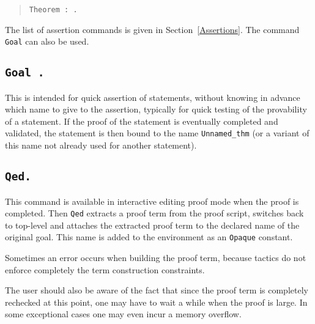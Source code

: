 \begin{quote}
{\tt Theorem {\ident} \zeroone{\binders} : {\form}.
\label{Theorem}}
\end{quote}

The list of assertion commands is given in
Section~\ref{Assertions}. The command {\tt Goal} can also be used.

\subsection[Goal {\form}.]{\tt Goal {\form}.\label{Goal}}

This is intended for quick assertion of statements, without knowing in
advance which name to give to the assertion, typically for quick
testing of the provability of a statement. If the proof of the
statement is eventually completed and validated, the statement is then
bound to the name {\tt Unnamed\_thm} (or a variant of this name not
already used for another statement).

\subsection[\tt Qed.]{\tt Qed.\label{Qed}}
This command is available in interactive editing proof mode when the
proof is completed.  Then {\tt Qed} extracts a proof term from the
proof script, switches back to {\Coq} top-level and attaches the
extracted proof term to the declared name of the original goal. This
name is added to the environment as an {\tt Opaque} constant.

\begin{ErrMsgs}
\item {}
\item Sometimes an error occurs when building the proof term,
because tactics do not enforce completely the term construction
constraints.

The user should also be aware of the fact that since the proof term is
completely rechecked at this point, one may have to wait a while when
the proof is large. In some exceptional cases one may even incur a
memory overflow.
\end{ErrMsgs}

